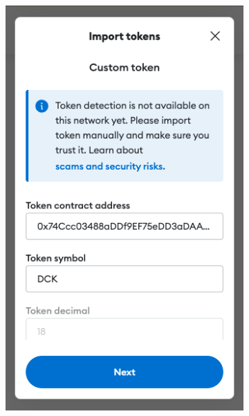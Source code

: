     \begin{figure}[ht!]
        \centering
        \begin{subfigure}{0.25\textwidth}
            \includegraphics[width=\textwidth]{IMAGES/metamask02.png}
            \label{fig_vsc}
        \end{subfigure}
        \hfill
        \begin{subfigure}{0.25\textwidth}

\end{subfigure}
\end{figure}
